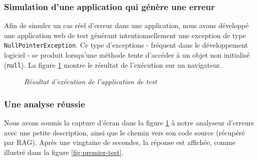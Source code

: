 \documentclass[12pt,a4paper]{report}
\begin{document}
	
	\subsubsection{Simulation d'une application qui génère une erreur}
	
	Afin de simuler un cas réel d'erreur dans une application, nous avons développé une application web de test générant intentionnellement une exception de type \verb|NullPointerException|. Ce type d'exceptions - fréquent dans le développement logiciel - se produit lorsqu'une méthode tente d'accéder à un objet non initialisé (\verb|null|). La figure \ref{fig:simulation-erreur} montre le résultat de l'exécution sur un navigateur.
	
	\begin{figure}[H]
		\centering
		\caption{\textit{Résultat d'exécution de l'application de test}}
		\label{fig:simulation-erreur}
	\end{figure}
	
	\subsubsection{Une analyse réussie}
	
	Nous avons soumis la capture d'écran dans la figure \ref{fig:simulation-erreur} à notre analyseur d'erreurs avec une petite description, ainsi que le chemin vers son code source (récupéré par RAG). Après une vingtaine de secondes, la réponse est affichée, comme illustré dans la figure \ref{fig:premier-test}.
	
\end{document}
